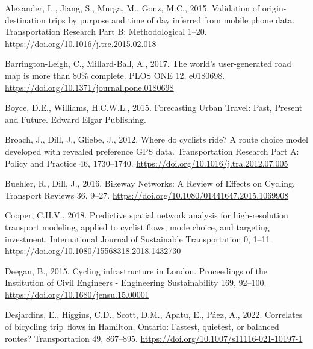 \documentclass{isprs} %
\newlength{\cslhangindent}
\newlength{\cslentryspacingunit} %
\newenvironment{CSLReferences}[2] %
 {%
  \setlength{\parindent}{0pt}
  \ifodd #1
  \let\oldpar\par
  \def\par{\hangindent=\cslhangindent\oldpar}
  \fi
  \setlength{\parskip}{#2\cslentryspacingunit}
 }%
 {}
\begin{document}
\hypertarget{refs}{}
\begin{CSLReferences}{0}{0}
\leavevmode{}%
Alexander, L., Jiang, S., Murga, M., Gonz, M.C., 2015. Validation of origin-destination trips by purpose and time of day inferred from mobile phone data. Transportation Research Part B: Methodological 1--20. \url{https://doi.org/10.1016/j.trc.2015.02.018}

\leavevmode{}%
Barrington-Leigh, C., Millard-Ball, A., 2017. The world's user-generated road map is more than 80\% complete. PLOS ONE 12, e0180698. \url{https://doi.org/10.1371/journal.pone.0180698}

\leavevmode{}%
Boyce, D.E., Williams, H.C.W.L., 2015. Forecasting {Urban Travel}: {Past}, {Present} and {Future}. {Edward Elgar Publishing}.

\leavevmode{}%
Broach, J., Dill, J., Gliebe, J., 2012. Where do cyclists ride? {A} route choice model developed with revealed preference {GPS} data. Transportation Research Part A: Policy and Practice 46, 1730--1740. \url{https://doi.org/10.1016/j.tra.2012.07.005}

\leavevmode{}%
Buehler, R., Dill, J., 2016. Bikeway {Networks}: {A Review} of {Effects} on {Cycling}. Transport Reviews 36, 9--27. \url{https://doi.org/10.1080/01441647.2015.1069908}

\leavevmode{}%
Cooper, C.H.V., 2018. Predictive spatial network analysis for high-resolution transport modeling, applied to cyclist flows, mode choice, and targeting investment. International Journal of Sustainable Transportation 0, 1--11. \url{https://doi.org/10.1080/15568318.2018.1432730}

\leavevmode{}%
Deegan, B., 2015. Cycling infrastructure in {London}. Proceedings of the Institution of Civil Engineers - Engineering Sustainability 169, 92--100. \url{https://doi.org/10.1680/jensu.15.00001}

\leavevmode{}%
Desjardins, E., Higgins, C.D., Scott, D.M., Apatu, E., Páez, A., 2022. Correlates of bicycling trip~flows in {Hamilton}, {Ontario}: Fastest, quietest, or balanced routes? Transportation 49, 867--895. \url{https://doi.org/10.1007/s11116-021-10197-1}


\end{CSLReferences}
\end{document}
